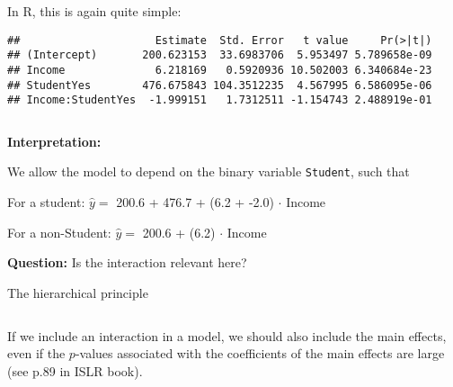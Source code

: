 \documentclass[10pt,ignorenonframetext,]{beamer}
\newenvironment{Shaded}{\begin{snugshade}}{\end{snugshade}}
\newcommand{\KeywordTok}[1]{\textcolor[rgb]{0.13,0.29,0.53}{\textbf{#1}}}
\newcommand{\NormalTok}[1]{#1}
\newcommand{\OperatorTok}[1]{\textcolor[rgb]{0.81,0.36,0.00}{\textbf{#1}}}
\newcommand{\StringTok}[1]{\textcolor[rgb]{0.31,0.60,0.02}{#1}}
\begin{document}
\begin{frame}[fragile]

In R, this is again quite simple:

\scriptsize

\begin{Shaded}
\end{Shaded}

\begin{verbatim}
##                     Estimate  Std. Error   t value     Pr(>|t|)
## (Intercept)       200.623153  33.6983706  5.953497 5.789658e-09
## Income              6.218169   0.5920936 10.502003 6.340684e-23
## StudentYes        476.675843 104.3512235  4.567995 6.586095e-06
## Income:StudentYes  -1.999151   1.7312511 -1.154743 2.488919e-01
\end{verbatim}

\(~\)

\normalsize

\textbf{Interpretation:}

We allow the model to depend on the binary variable \texttt{Student},
such that

For a student: \(\hat{y} =\) 200.6 + 476.7 + (6.2 + -2.0) \(\cdot\)
Income

For a non-Student: \(\hat{y} =\) 200.6 + (6.2) \(\cdot\) Income

\vspace{2mm}

\textbf{Question:} Is the interaction relevant here?

\end{frame}

\begin{frame}

\begin{block}{The hierarchical principle}

\(~\)

If we include an interaction in a model, we should also include the main
effects, even if the \(p\)-values associated with the coefficients of
the main effects are large (see p.89 in ISLR book).

\end{block}

\end{frame}
\end{document}
